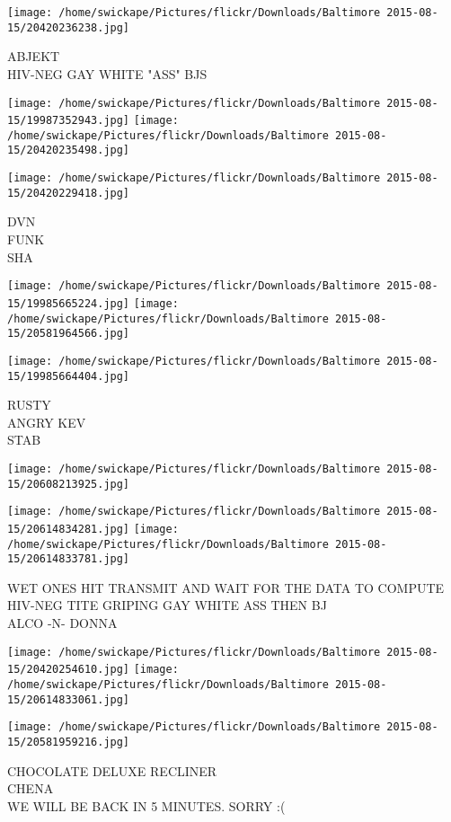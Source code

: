 \documentclass[10pt,letterpaper]{article}
\begin{document}
\vspace{0.25in}
\texttt{[image: /home/swickape/Pictures/flickr/Downloads/Baltimore 2015-08-15/20420236238.jpg]}

ABJEKT\\
HIV{-}NEG GAY WHITE "ASS" BJS\\
\pagebreak

\texttt{[image: /home/swickape/Pictures/flickr/Downloads/Baltimore 2015-08-15/19987352943.jpg]}
\texttt{[image: /home/swickape/Pictures/flickr/Downloads/Baltimore 2015-08-15/20420235498.jpg]}

\vspace{0.25in}
\texttt{[image: /home/swickape/Pictures/flickr/Downloads/Baltimore 2015-08-15/20420229418.jpg]}

DVN\\
FUNK\\
SHA\\
\pagebreak

\texttt{[image: /home/swickape/Pictures/flickr/Downloads/Baltimore 2015-08-15/19985665224.jpg]}
\texttt{[image: /home/swickape/Pictures/flickr/Downloads/Baltimore 2015-08-15/20581964566.jpg]}

\texttt{[image: /home/swickape/Pictures/flickr/Downloads/Baltimore 2015-08-15/19985664404.jpg]}

RUSTY\\
ANGRY KEV\\
STAB\\
\pagebreak

\texttt{[image: /home/swickape/Pictures/flickr/Downloads/Baltimore 2015-08-15/20608213925.jpg]}

\vspace{0.25in}
\texttt{[image: /home/swickape/Pictures/flickr/Downloads/Baltimore 2015-08-15/20614834281.jpg]}
\texttt{[image: /home/swickape/Pictures/flickr/Downloads/Baltimore 2015-08-15/20614833781.jpg]}

WET ONES HIT TRANSMIT AND WAIT FOR THE DATA TO COMPUTE\\
HIV{-}NEG TITE GRIPING GAY WHITE ASS THEN BJ\\
ALCO {-}N{-} DONNA\\
\pagebreak

\texttt{[image: /home/swickape/Pictures/flickr/Downloads/Baltimore 2015-08-15/20420254610.jpg]}
\texttt{[image: /home/swickape/Pictures/flickr/Downloads/Baltimore 2015-08-15/20614833061.jpg]}

\texttt{[image: /home/swickape/Pictures/flickr/Downloads/Baltimore 2015-08-15/20581959216.jpg]}

CHOCOLATE DELUXE RECLINER\\
CHENA\\
WE WILL BE BACK IN 5 MINUTES.  SORRY :(\\
\pagebreak
\end{document}
